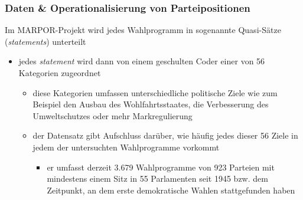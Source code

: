 \documentclass[11pt]{article}
\begin{document}
\subsubsection{Daten \& Operationalisierung von Parteipositionen}
\label{sec:org797e00c}
Im MARPOR-Projekt wird jedes Wahlprogramm in sogenannte Quasi-Sätze (\emph{statements}) unterteilt
\begin{itemize}
\item jedes \emph{statement} wird dann von einem geschulten Coder einer von 56 Kategorien zugeordnet
\begin{itemize}
\item diese Kategorien umfassen unterschiedliche politische Ziele wie zum Beispiel den Ausbau des Wohlfahrtsstaates, die Verbesserung des Umweltschutzes oder mehr Markregulierung
\item der Datensatz gibt Aufschluss darüber, wie häufig jedes dieser 56 Ziele in jedem der untersuchten Wahlprogramme vorkommt
\begin{itemize}
\item er umfasst derzeit 3.679 Wahlprogramme von 923 Parteien mit mindestens einem Sitz in 55 Parlamenten seit 1945 bzw. dem Zeitpunkt, an dem erste demokratische Wahlen stattgefunden haben
\end{itemize}
\end{itemize}
\end{itemize}
\end{document}
